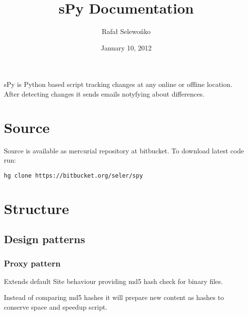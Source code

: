 \documentclass[letterpaper,10pt,english]{sphinxmanual}
\title{sPy Documentation}
\date{January 10, 2012}
\author{Rafał Selewońko}
\begin{document}
\maketitle
\tableofcontents
{}\label{index::doc}


sPy is Python based script tracking changes at any online or offline location.
After detecting changes it sends emails notyfying about differences.


\chapter{Source}
\label{index:welcome-to-spy-s-documentation}\label{index:source}
Source is available as mercurial repository at bitbucket. To download latest code run:

\begin{Verbatim}[commandchars=\\\{\}]
hg clone https://bitbucket.org/seler/spy
\end{Verbatim}


\chapter{Structure}
\label{index:structure}

\section{Design patterns}
\label{index:design-patterns}

\subsection{Proxy pattern}
\label{index:proxy-pattern}

\begin{fulllineitems}
\label{index:spy.BinarySite}
Extends default Site behaviour providing md5 hash check for binary files.

\begin{fulllineitems}
\label{index:spy.BinarySite.parse_new_content}
Instead of comparing md5 hashes it will prepare new content as
hashes to conserve space and speedup script.

\end{fulllineitems}


\end{fulllineitems}
\end{document}
